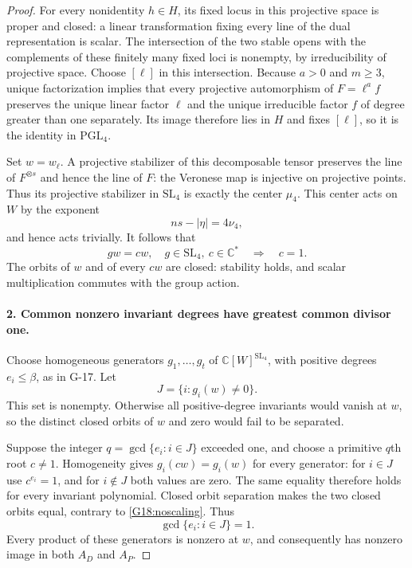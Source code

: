 \documentclass[11pt,a4paper]{article}
\theoremstyle{definition}\newtheorem{definition}{Definition}
\begin{document}
\begin{proof}
For every nonidentity $h\in H$, its fixed locus in this projective
space is proper and closed: a linear transformation fixing every
line of the dual representation is scalar. The intersection of
the two stable opens with the complements of these finitely many
fixed loci is nonempty, by irreducibility of projective space.
Choose $[\ell]$ in this intersection. Because $a>0$ and $m\geq3$,
unique factorization implies that every projective automorphism of
$F=\ell^a f$ preserves the unique linear factor $\ell$ and the
unique irreducible factor $f$ of degree greater than one separately.
Its image therefore lies in $H$ and fixes $[\ell]$, so it is the
identity in $\mathrm{PGL}_4$.

Set $w=w_\ell$. A projective stabilizer of this decomposable tensor
preserves the line of $F^{\otimes s}$ and hence the line of $F$:
the Veronese map is injective on projective points. Thus its
projective stabilizer in $\mathrm{SL}_4$ is exactly the center
$\mu_4$. This center acts
on $W$ by the exponent
\[
 ns-|\eta|=4\nu_4,
\]
and hence acts trivially. It follows that
\begin{equation}\label{G18:noscaling}
 gw=cw,\quad g\in\mathrm{SL}_4,\ c\in\mathbb C^*
 \quad\Longrightarrow\quad c=1.
\end{equation}
The orbits of $w$ and of every $cw$ are closed: stability holds,
and scalar multiplication commutes with the group action.

\paragraph{2. Common nonzero invariant degrees have greatest common divisor one.}
Choose homogeneous generators $g_1,\ldots,g_t$ of
$\mathbb C[W]^{\mathrm{SL}_4}$, with positive degrees
$e_i\leq\beta$, as in G-17. Let
\[
 J=\{i:g_i(w)\ne0\}.
\]
This set is nonempty. Otherwise all positive-degree invariants
would vanish at $w$, so the distinct closed orbits of $w$ and zero
would fail to be separated.

Suppose the integer $q=\gcd\{e_i:i\in J\}$ exceeded one, and
choose a primitive $q$th root $c\ne1$. Homogeneity gives
$g_i(cw)=g_i(w)$ for every generator: for $i\in J$ use
$c^{e_i}=1$, and for $i\notin J$ both values are zero. The same
equality therefore holds for every invariant polynomial. Closed
orbit separation makes the two closed orbits equal, contrary to
\eqref{G18:noscaling}. Thus
\begin{equation}\label{G18:gcd}
 \gcd\{e_i:i\in J\}=1.
\end{equation}
Every product of these generators is nonzero at $w$, and consequently
has nonzero image in both $A_D$ and $A_P$.


\end{proof}
\end{document}

